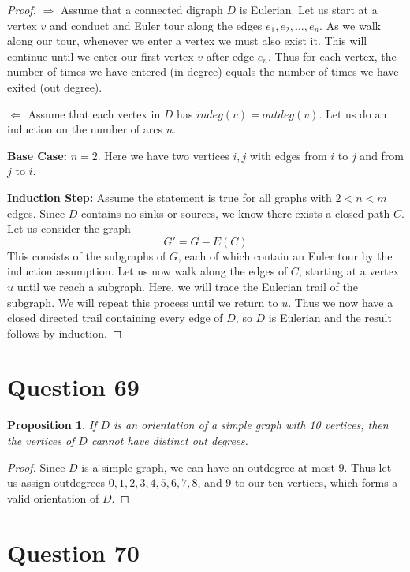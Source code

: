 \documentclass[11pt, oneside]{article}   	%
\newtheorem{proposition}{Proposition}
\begin{document}
\begin{proof}
$\Rightarrow$ Assume that a connected digraph $D$ is Eulerian. Let us start at a vertex $v$ and conduct and Euler tour along the edges $e_1, e_2, \ldots, e_n$. As we walk along our tour, whenever we enter a vertex we must also exist it. This will continue until we enter our first vertex $v$ after edge $e_n$. Thus for each vertex, the number of times we have entered (in degree) equals the number of times we have exited (out degree).

$\Leftarrow$ Assume that each vertex in $D$ has $indeg(v)=outdeg(v)$. Let us do an induction on the number of arcs $n$. 

\textbf{Base Case:} $n=2$. Here we have two vertices $i, j$ with edges from $i$ to $j$ and from $j$ to $i$.
\vspace{1cm}

\textbf{Induction Step:} Assume the statement is true for all graphs with $2<n<m$ edges. Since $D$ contains no sinks or sources, we know there exists a closed path $C$. Let us consider the graph
$$G'=G-E(C)$$
This consists of the subgraphs of $G$, each of which contain an Euler tour by the induction assumption. Let us now walk along the edges of $C$, starting at a vertex $u$ until we reach a subgraph. Here, we will trace the Eulerian trail of the subgraph. We will repeat this process until we return to $u$. Thus we now have a closed directed trail containing every edge of $D$, so $D$ is Eulerian and the result follows by induction.
\end{proof}

\section*{Question 69}

\begin{proposition}
If $D$ is an orientation of a simple graph with 10 vertices, then the vertices of $D$ cannot have distinct out degrees.
\end{proposition}

\begin{proof}
Since $D$ is a simple graph, we can have an outdegree at most 9. Thus let us assign outdegrees $0,1,2,3,4,5,6,7,8$, and 9 to our ten vertices, which forms a valid orientation of $D$.
\end{proof}


\section*{Question 70}
\end{document}
